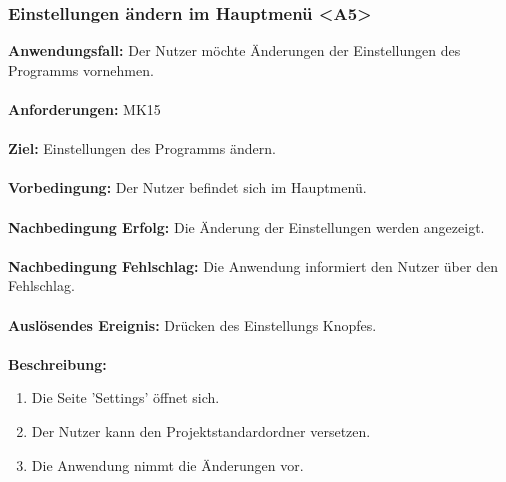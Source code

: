 \documentclass[parskip=full]{scrartcl} %
\begin{document}
\subsubsection*{Einstellungen ändern im Hauptmenü <A5>}
\textbf{Anwendungsfall:} Der Nutzer möchte Änderungen der Einstellungen des Programms vornehmen. \\\\
\textbf{Anforderungen:} MK15\\\\
\textbf{Ziel:} Einstellungen des Programms ändern.\\\\
\textbf{Vorbedingung:}  Der Nutzer befindet sich im Hauptmenü.  \\\\
\textbf{Nachbedingung Erfolg:} Die Änderung der Einstellungen werden angezeigt.\\\\
\textbf{Nachbedingung Fehlschlag:} Die Anwendung informiert den Nutzer über den Fehlschlag.\\\\
\textbf{Auslösendes Ereignis:} Drücken des Einstellungs Knopfes. \\\\
\textbf{Beschreibung:}
\begin{enumerate}
    \item Die Seite 'Settings' öffnet sich.
    \item Der Nutzer kann den Projektstandardordner versetzen.
    \item Die Anwendung nimmt die Änderungen vor.
\end{enumerate}
\newpage
\end{document}

